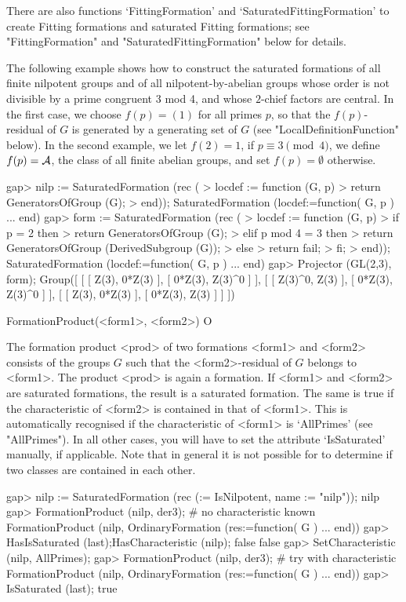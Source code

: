 There are also functions `FittingFormation' and `SaturatedFittingFormation' to create
Fitting formations and saturated Fitting formations; see
 "FittingFormation" and "SaturatedFittingFormation" below for details. 

The following example shows how to construct the saturated formations of all finite
nilpotent groups and of all nilpotent-by-abelian groups whose order is not divisible by a
prime congruent 3 mod 4, and whose $2$-chief factors are central. In the first case, we
choose $f(p) = (1)$ for all primes $p$, so that the $f(p)$-residual of $G$ is generated
by a generating set of $G$ (see "LocalDefinitionFunction" below). In the second example,
we let $f(2) = 1$, if $p \equiv 3 \pmod 4$, we define $f(p) = {\cal A}$, the class of
all finite abelian groups, and set
$f(p) =
\emptyset$ otherwise.

\beginexample
gap> nilp := SaturatedFormation (rec (
>      locdef := function (G, p)
>          return GeneratorsOfGroup (G);
>      end));
SaturatedFormation (locdef:=function( G, p ) ... end)
gap> form := SaturatedFormation (rec (
>    locdef := function (G, p)
>        if p = 2 then
>           return GeneratorsOfGroup (G);
>        elif p mod 4 = 3 then
>           return GeneratorsOfGroup (DerivedSubgroup (G));
>        else
>           return fail;
>        fi;
>     end));
SaturatedFormation (locdef:=function( G, p ) ... end)
gap> Projector (GL(2,3), form);
Group([ [ [ Z(3), 0*Z(3) ], [ 0*Z(3), Z(3)^0 ] ], 
  [ [ Z(3)^0, Z(3) ], [ 0*Z(3), Z(3)^0 ] ], 
  [ [ Z(3), 0*Z(3) ], [ 0*Z(3), Z(3) ] ] ])
\endexample

\>FormationProduct(<form1>, <form2>) O

The formation product <prod> of two formations <form1> and <form2> 
consists  of the groups $G$ such that the <form2>-residual of $G$ belongs to
<form1>. The product <prod> is again a formation. If <form1>
and <form2> are saturated formations, the result is a saturated
formation. The same is true if the characteristic of <form2> is contained in
that of <form1>. This is automatically recognised if the characteristic of
<form1> is `AllPrimes' (see "AllPrimes"). In all other cases, you
will have to set the attribute `IsSaturated' manually, if applicable. Note
that in general it is not possible for {\CRISP} to determine if two classes
are contained in each other.

\beginexample
gap> nilp := SaturatedFormation (rec (\in := IsNilpotent, name := "nilp"));
nilp
gap> FormationProduct (nilp, der3); # no characteristic known
FormationProduct (nilp, OrdinaryFormation (res:=function( G ) ... end))
gap> HasIsSaturated (last);HasCharacteristic (nilp);
false
false
gap> SetCharacteristic (nilp, AllPrimes);
gap> FormationProduct (nilp, der3); # try with characteristic
FormationProduct (nilp, OrdinaryFormation (res:=function( G ) ... end))
gap> IsSaturated (last);
true
\endexample


